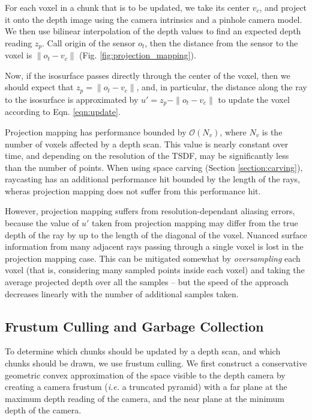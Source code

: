 For each voxel in a chunk that is to be updated, we take its center $v_c$, and
project it onto the depth image using the camera intrinsics and a pinhole camera
model. We then use bilinear interpolation of the depth values to find an
expected depth reading $z_p$. Call origin of the sensor  $o_t$,   then the 
distance from the sensor to the voxel is $\|o_t - v_c\|$ (Fig. \ref{fig:projection_mapping}).

Now, if the isosurface passes directly through the center of the voxel,
then we should expect that $z_p = \|o_t - v_c\|$, and, in particular, the
distance along the ray to the isosurface is approximated by $u' = z_p - \|o_t -
v_c\|$ to update the voxel according to Eqn. \ref{eqn:update}.

Projection mapping has performance bounded by $\mathcal{O}(N_v)$, where $N_v$ is
the number of voxels affected by a depth scan. This value is nearly constant
over time, and depending on the resolution of the TSDF, may be significantly
less than the number of points. When using space carving (Section
\ref{section:carving}), raycasting has an additional performance hit bounded by
the length of the rays, wheras projection mapping does not suffer from this
performance hit.

However, projection mapping suffers from resolution-dependant aliasing errors,
because the value of $u'$ taken from projection mapping may differ from the true
depth of the ray by up to the length of the diagonal of the voxel. Nuanced
surface information from many adjacent rays passing through a single voxel is
lost in the projection mapping case. This can be mitigated somewhat by
\textit{oversampling} each voxel (that is, considering many sampled points
inside each voxel) and taking the average projected depth over all the samples
-- but the speed of the approach decreases linearly with the number of 
additional samples taken. 

\subsection{Frustum Culling and Garbage Collection}
To determine which chunks should be updated by a depth scan, and which chunks
should be drawn, we use frustum culling. We first construct a conservative
geometric convex approximation of the space visible to the depth camera by
creating a camera frustum (\textit{i.e.} a truncated pyramid) with a far plane
at the maximum depth reading of the camera, and the near plane at the minimum
depth of the camera. 

